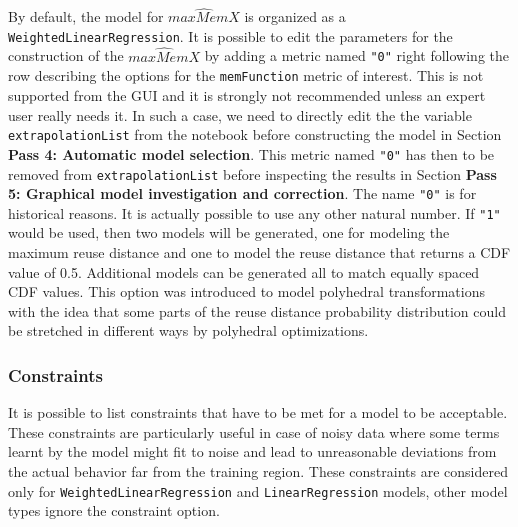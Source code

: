 \documentclass[a4paper, 10pt]{article}
\begin{document}
By default, the model for $\widehat{maxMemX}$ is organized as a \verb!WeightedLinearRegression!. It is possible to edit the parameters
for the construction of the $\widehat{maxMemX}$ by adding a metric named \verb!"0"! right following the row describing the options for the
\verb!memFunction! metric of interest. This is not supported from the GUI and it is strongly not recommended unless an expert user
really needs it. In such a case, we need to directly edit the the variable \verb!extrapolationList! from the \ex
notebook before constructing the model in Section \textbf{Pass 4: Automatic model selection}.
This metric named \verb!"0"! has then to be removed from \verb!extrapolationList! before inspecting the results in 
Section \textbf{Pass 5: Graphical model investigation and correction}.
The name \verb!"0"! is for historical reasons. It is actually possible to use any other natural number.
If \verb!"1"! would be used, then two models will be generated, one for modeling the maximum reuse distance and one to model the reuse distance
that returns a CDF value of 0.5. Additional models can be generated all to match equally spaced CDF values. This option was introduced to
model polyhedral transformations with the idea that some parts of the reuse distance probability distribution
could be stretched in different ways by polyhedral optimizations.

\subsubsection{Constraints}
\label{sec:Constraints}

It is possible to list constraints that have to be met for a model to be acceptable. These constraints are particularly useful
in case of noisy data where some terms learnt by the model might fit to noise and lead to unreasonable deviations from the actual behavior
far from the training region. These constraints are considered only for \verb!WeightedLinearRegression! and \verb!LinearRegression! models,
other model types ignore the constraint option.
\end{document}
